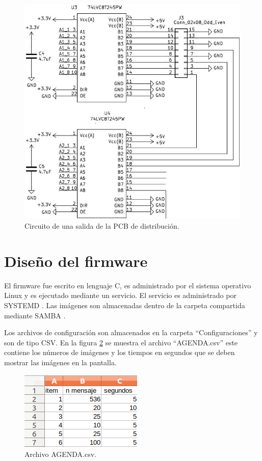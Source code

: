 \begin{figure}[htpb]
	\centering
    \includegraphics[scale=0.5]{Figures/circuitodistribucion.jpg} 
	\caption{Circuito de una salida de la PCB de distribución.}
	\label{fig:circuitodistribucion}
\end{figure}




\pagebreak

\section{ Diseño del firmware}
El firmware fue escrito en lenguaje C, es administrado por el sistema operativo Linux y  es ejecutado mediante un servicio. El servicio es administrado por SYSTEMD \citep{REFSYSTEMD}. Las imágenes son almacenadas  dentro de la carpeta compartida mediante SAMBA \citep{WIKISAMBA}. 

Los archivos de configuración son almacenados en la carpeta ``Configuraciones'' y son de tipo CSV. En la figura \ref{fig:agendacsv} se muestra el archivo ``AGENDA.csv'' este contiene los números de imágenes y los tiempos en segundos que se deben mostrar las imágenes en la pantalla.

\begin{figure}[htpb]
	\centering
    \includegraphics[scale=0.7]{Figures/Agenda.png} 
	\caption{Archivo AGENDA.csv.}
	\label{fig:agendacsv}
\end{figure}


